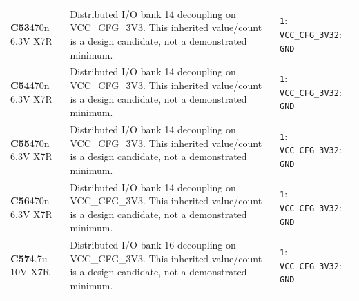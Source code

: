 \documentclass[11pt,a4paper]{article}
\begin{document}
\begin{longtable}{@{}P{27mm}P{84mm}P{57mm}@{}}
\textbf{C53}\newline 470n 6.3V X7R & Distributed I/O bank 14 decoupling on VCC\_CFG\_3V3. This inherited value/count is a design candidate, not a demonstrated minimum. & \nolinkurl{1}: \nolinkurl{VCC_CFG_3V3}\newline \nolinkurl{2}: \nolinkurl{GND} \\
\textbf{C54}\newline 470n 6.3V X7R & Distributed I/O bank 14 decoupling on VCC\_CFG\_3V3. This inherited value/count is a design candidate, not a demonstrated minimum. & \nolinkurl{1}: \nolinkurl{VCC_CFG_3V3}\newline \nolinkurl{2}: \nolinkurl{GND} \\
\textbf{C55}\newline 470n 6.3V X7R & Distributed I/O bank 14 decoupling on VCC\_CFG\_3V3. This inherited value/count is a design candidate, not a demonstrated minimum. & \nolinkurl{1}: \nolinkurl{VCC_CFG_3V3}\newline \nolinkurl{2}: \nolinkurl{GND} \\
\textbf{C56}\newline 470n 6.3V X7R & Distributed I/O bank 14 decoupling on VCC\_CFG\_3V3. This inherited value/count is a design candidate, not a demonstrated minimum. & \nolinkurl{1}: \nolinkurl{VCC_CFG_3V3}\newline \nolinkurl{2}: \nolinkurl{GND} \\
\textbf{C57}\newline 4.7u 10V X7R & Distributed I/O bank 16 decoupling on VCC\_CFG\_3V3. This inherited value/count is a design candidate, not a demonstrated minimum. & \nolinkurl{1}: \nolinkurl{VCC_CFG_3V3}\newline \nolinkurl{2}: \nolinkurl{GND} \\

\end{longtable}
\end{document}
